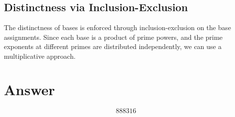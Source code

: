 \documentclass[12pt]{article}
\begin{document}
\subsection{Distinctness via Inclusion-Exclusion}

The distinctness of bases is enforced through inclusion-exclusion on the base assignments. Since each base is a product of prime powers, and the prime exponents at different primes are distributed independently, we can use a multiplicative approach.

\section{Answer}

\[
\boxed{888316}
\]
\end{document}

